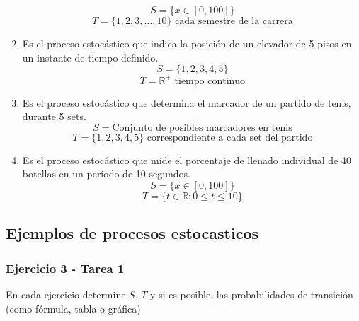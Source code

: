 \documentclass{article}
\begin{document}
\begin{enumerate}
          \[ S = \{x \in [0, 100]\} \]
          \[ T = \{1,2,3,\dots,10\} \text{ cada semestre de la carrera} \]
    \item Es el proceso estocástico que indica la posición de un elevador de 5 pisos en un instante de tiempo definido.
          \[ S = \{1,2,3,4,5\} \]
          \[ T = \mathbb{R}^+ \text{ tiempo continuo} \]
    \item Es el proceso estocástico que determina el marcador de un partido de tenis, durante 5 sets.
          \[ S = \text{Conjunto de posibles marcadores en tenis} \]
          \[ T = \{1,2,3,4,5\} \text{ correspondiente a cada set del partido} \]
    \item Es el proceso estocástico que mide el porcentaje de llenado individual de 40 botellas en un período de 10 segundos.
          \[ S = \{x \in [0, 100]\} \]
          \[ T = \{t \in \mathbb{R} : 0 \leq t \leq 10\} \]
\end{enumerate}

\subsection{Ejemplos de procesos estocasticos}

\subsubsection{Ejercicio 3 - Tarea 1}

En cada ejercicio determine \( S \), \( T \) y si es posible, las probabilidades de transición (como fórmula, tabla o gráfica)
\end{document}

